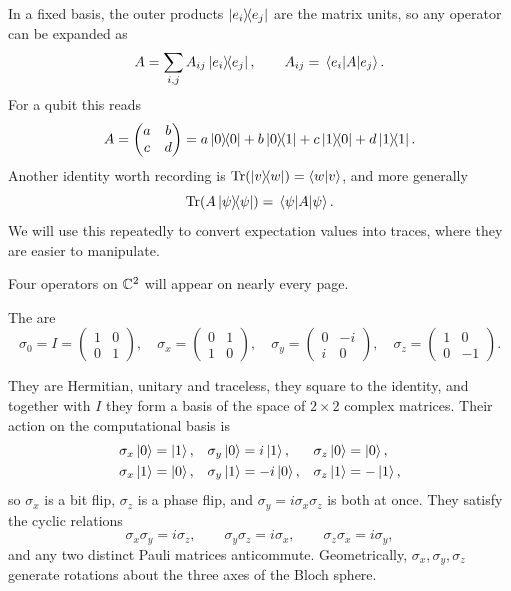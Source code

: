 \documentclass[a4paper]{scrartcl}
\begin{document}
In a fixed basis, the outer products $\op{e_i}{e_j}$ are the matrix units, so any operator can be expanded as
$$A = \sum_{i,j} A_{ij} \op{e_i}{e_j}, \qquad A_{ij} = \mel{e_i}{A}{e_j}.$$
For a qubit this reads
$$A = \begin{pmatrix} a & b \\ c & d\end{pmatrix} = a \op{0}{0} + b\op{0}{1} + c\op{1}{0} + d\op{1}{1}.$$
Another identity worth recording is $\Tr\!\left(\op{v}{w}\right) = \ip{w}{v}$, and more generally
$$\Tr\!\left(A \op{\psi}{\psi}\right) = \mel{\psi}{A}{\psi}.$$
We will use this repeatedly to convert expectation values into traces, where they are easier to manipulate.

Four operators on $\mathbb{C}^2$ will appear on nearly every page.

\begin{definition}
	The  are
	$$\sigma_0 = I = \begin{pmatrix} 1 & 0 \\ 0 & 1 \end{pmatrix},\quad \sigma_x = \begin{pmatrix} 0 & 1 \\ 1 & 0\end{pmatrix},\quad \sigma_y = \begin{pmatrix} 0 & -i \\ i & 0\end{pmatrix},\quad \sigma_z = \begin{pmatrix} 1 & 0 \\ 0 & -1\end{pmatrix}.$$
\end{definition}

They are Hermitian, unitary and traceless, they square to the identity, and together with $I$ they form a basis of the space of $2\times 2$ complex matrices. Their action on the computational basis is
\begin{align*}
	\sigma_x \ket{0} &= \ket{1}, & \sigma_y\ket{0} &= i\ket{1}, & \sigma_z\ket{0} &= \ket{0},\\
	\sigma_x\ket{1} &= \ket{0}, & \sigma_y\ket{1} &= -i\ket{0}, & \sigma_z\ket{1} &= -\ket{1},
\end{align*}
so $\sigma_x$ is a bit flip, $\sigma_z$ is a phase flip, and $\sigma_y = i\sigma_x\sigma_z$ is both at once. They satisfy the cyclic relations
$$\sigma_x\sigma_y = i\sigma_z, \qquad \sigma_y\sigma_z = i\sigma_x, \qquad \sigma_z\sigma_x = i\sigma_y,$$
and any two distinct Pauli matrices anticommute. Geometrically, $\sigma_x, \sigma_y, \sigma_z$ generate rotations about the three axes of the Bloch sphere.
\end{document}
